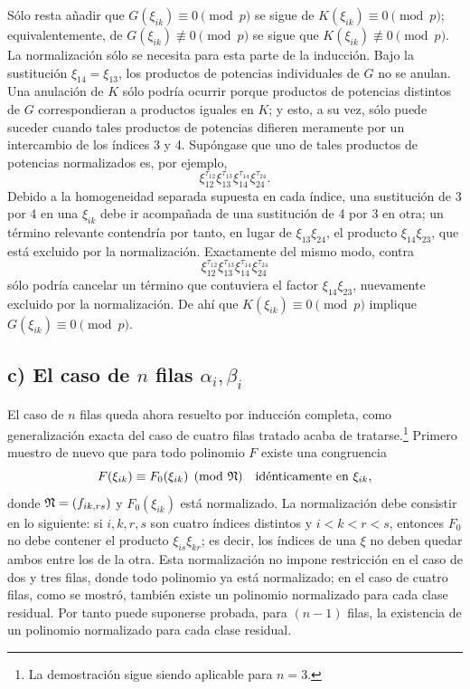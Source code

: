 \documentclass[11pt]{article}
\begin{document}
Sólo resta añadir que \(G(\xi_{ik})\equiv0\pmod p\) se sigue de \(K(\xi_{ik})\equiv0\pmod p\); equivalentemente, de \(G(\xi_{ik})\not\equiv0\pmod p\) se sigue que \(K(\xi_{ik})\not\equiv0\pmod p\). La normalización sólo se necesita para esta parte de la inducción. Bajo la sustitución \(\xi_{14}=\xi_{13}\), los productos de potencias individuales de \(G\) no se anulan. Una anulación de \(K\) sólo podría ocurrir porque productos de potencias distintos de \(G\) correspondieran a productos iguales en \(K\); y esto, a su vez, sólo puede suceder cuando tales productos de potencias difieren meramente por un intercambio de los índices 3 y 4. Supóngase que uno de tales productos de potencias normalizados es, por ejemplo,
\[
        \xi_{12}^{\tau_{12}}\xi_{13}^{\tau_{13}}\xi_{14}^{\tau_{14}}\xi_{24}^{\tau_{24}}.
\]
Debido a la homogeneidad separada supuesta en cada índice, una sustitución de 3 por 4 en una \(\xi_{ik}\) debe ir acompañada de una sustitución de 4 por 3 en otra; un término relevante contendría por tanto, en lugar de \(\xi_{13}\xi_{24}\), el producto \(\xi_{14}\xi_{23}\), que está excluido por la normalización. Exactamente del mismo modo, contra
\[
        \xi_{12}^{\tau_{12}}\xi_{13}^{\tau_{13}}\xi_{14}^{\tau_{14}}\xi_{24}^{\tau_{24}}
\]
sólo podría cancelar un término que contuviera el factor \(\xi_{14}\xi_{23}\), nuevamente excluido por la normalización. De ahí que \(K(\xi_{ik})\equiv0\pmod p\) implique \(G(\xi_{ik})\equiv0\pmod p\).

\subsection*{c) El caso de \(n\) filas \(\alpha_i,\beta_i\)}

El caso de \(n\) filas queda ahora resuelto por inducción completa, como generalización exacta del caso de cuatro filas tratado acaba de tratarse.\footnote{La demostración sigue siendo aplicable para \(n=3\).}
Primero muestro de nuevo que para todo polinomio \(F\) existe una congruencia
\begin{equation}
        F(\xi_{ik})\equiv F_0(\xi_{ik})\pmod{\mathfrak N}
        \quad \text{idénticamente en \(\xi_{ik}\)},
\end{equation}
donde \(\mathfrak N=(f_{ik,rs})\) y \(F_0(\xi_{ik})\) está normalizado. La normalización debe consistir en lo siguiente: si \(i,k,r,s\) son cuatro índices distintos y \(i<k<r<s\), entonces \(F_0\) no debe contener el producto \(\xi_{is}\xi_{kr}\); es decir, los índices de una \(\xi\) no deben quedar ambos entre los de la otra. Esta normalización no impone restricción en el caso de dos y tres filas, donde todo polinomio ya está normalizado; en el caso de cuatro filas, como se mostró, también existe un polinomio normalizado para cada clase residual. Por tanto puede suponerse probada, para \((n-1)\) filas, la existencia de un polinomio normalizado para cada clase residual.
\end{document}
